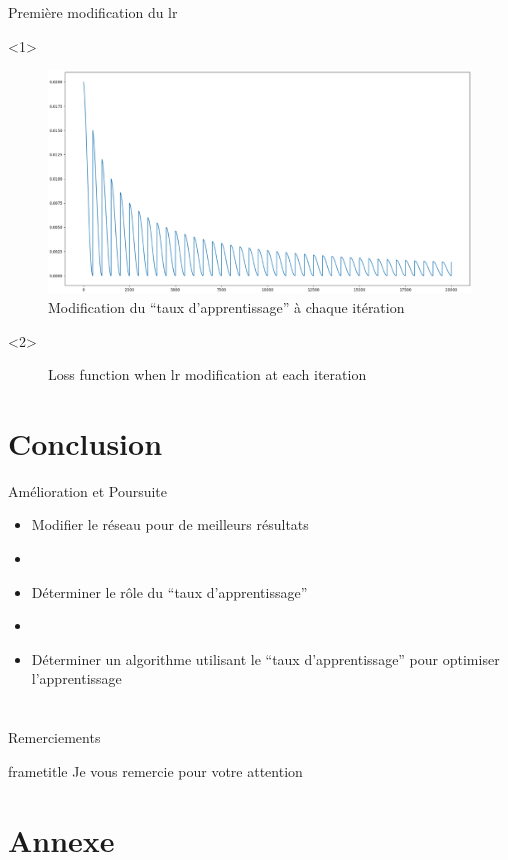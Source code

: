 \documentclass{beamer}
\begin{document}
\begin{frame}[t]{Première modification du lr}
  \begin{onlyenv}<1>
    \begin{figure}
      \begin{center}
        \includegraphics[scale=0.17]{annex/lr_modification}
        \caption{Modification du ``taux d'apprentissage'' à chaque itération}
        \label{ModLR}
      \end{center}
    \end{figure}
  \end{onlyenv}
  \begin{onlyenv}<2>
    \begin{figure}
      \caption{Loss function when lr modification at each iteration}
      \label{FigLR}
    \end{figure}
  \end{onlyenv}
\end{frame}

\section*{Conclusion}

\begin{frame}[t]{Amélioration et Poursuite}
  \begin{itemize}
    \item Modifier le réseau pour de meilleurs résultats
    \item[]
    \item Déterminer le rôle du ``taux d'apprentissage''
    \item[]
    \item Déterminer un algorithme utilisant le ``taux d'apprentissage'' pour optimiser l'apprentissage
  \end{itemize}
\end{frame}

\section*{}

\begin{frame}{Remerciements}
  \begin{beamercolorbox}[ht=2.5ex,dp=1.5ex,center]{frametitle}
    Je vous remercie pour votre attention
  \end{beamercolorbox}
\end{frame}

\appendix

\section*{Annexe}
\end{document}
